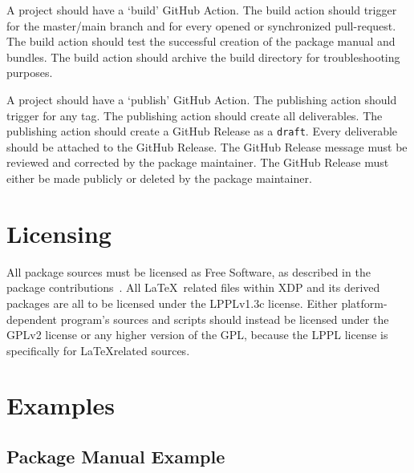 \documentclass{xdpdoc}
\begin{document}
\begin{multicols}{2}
        A project should have a `build' GitHub Action.
        The build action should trigger for the master/main branch and for every opened or synchronized pull-request.
        The build action should test the successful creation of the package manual and bundles.
        The build action should archive the build directory for troubleshooting purposes.

        A project should have a `publish' GitHub Action.
        The publishing action should trigger for any tag.
        The publishing action should create all deliverables.
        The publishing action should create a GitHub Release as a \texttt{draft}.
        Every deliverable should be attached to the GitHub Release.
        The GitHub Release message must be reviewed and corrected by the package maintainer.
        The GitHub Release must either be made publicly or deleted by the package maintainer.


        \section{Licensing}\label{sec:licensing}

        All package sources must be licensed as Free Software,
        as described in the \TeXLive package contributions~\cite{texlive-packaging}.
        All \LaTeX\ related files within XDP and its derived packages are all to be licensed under the LPPLv1.3c license.
        Either platform-dependent program's sources and scripts should instead be licensed under the GPLv2 license or any higher version of the GPL,
        because the LPPL license is specifically for \LaTeX related sources.

    \end{multicols}

    \printbibliography

    \clearpage

    \section{Examples}\label{sec:examples}

    \subsection{Package Manual Example}

    
\end{document}
